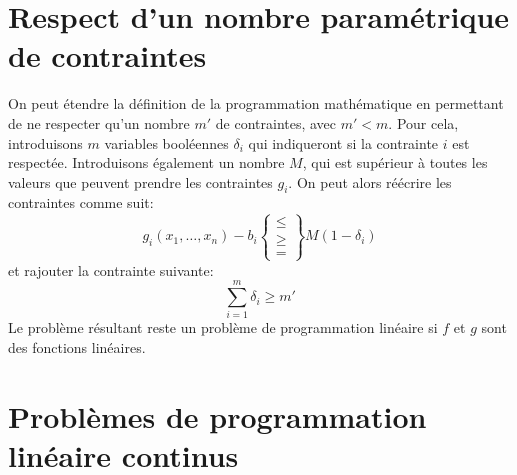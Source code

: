 \documentclass[a4paper]{report}
\theoremstyle{definition}
\theoremstyle{remark}
\theoremstyle{plain}
\begin{document}
\section{Respect d'un nombre paramétrique de contraintes}
On peut étendre la définition de la programmation mathématique en permettant
de ne respecter qu'un nombre \(m'\) de contraintes, avec \(m'<m\).
Pour cela, introduisons \(m\) variables booléennes \(\delta_i\) qui indiqueront
si la contrainte \(i\) est respectée. Introduisons également un nombre \(M\),
qui est supérieur à toutes les valeurs que peuvent prendre les contraintes
\(g_i\). On peut alors réécrire les contraintes
comme suit:
\[g_i(x_1,\dots,x_n)-b_i\begin{Bmatrix}\le\\\ge\\=\end{Bmatrix}M(1-\delta_i)\]
et rajouter la contrainte suivante:
\[\sum_{i=1}^{m}\delta_i\ge m'\]
Le problème résultant reste un problème de programmation linéaire si \(f\) et
\(g\) sont des fonctions linéaires.

\section{Problèmes  de programmation linéaire continus}
\end{document}
